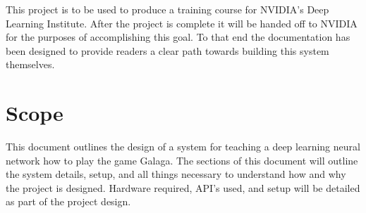 \documentclass{scrreprt}
\begin{document}
This project is to be used to produce a training course for NVIDIA's Deep Learning Institute.
After the project is complete it will be handed off to NVIDIA for the purposes of accomplishing this goal.
To that end the documentation has been designed to provide readers a clear path towards building this system themselves.

\section{Scope}

This document outlines the design of a system for teaching a deep learning neural network how to play the game Galaga.
The sections of this document will outline the system details, setup, and all things necessary to understand how and why the project is designed.
Hardware required, API's used, and setup will be detailed as part of the project design.
\end{document}
